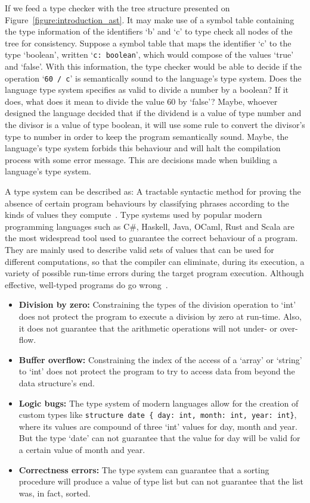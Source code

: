 \documentclass[english, lmodern, oneside, embeddedlogo]{ufsc-thesis-rn46-2019}
\begin{document}
If we feed a type checker with the tree structure presented on Figure~\ref{figure:introduction_ast}.
It may make use of a symbol table containing the type information of the identifiers `b' and `c' to type check all nodes of the tree for consistency.
Suppose a symbol table that maps the identifier `c' to the type `boolean', written `\verb+c: boolean+', which would compose of the values `true' and `false'.
With this information, the type checker would be able to decide if the operation `\verb+60 / c+' is semantically sound to the language's type system.
Does the language type system specifies as valid to divide a number by a boolean?
If it does, what does it mean to divide the value 60 by `false'?
Maybe, whoever designed the language decided that if the dividend is a value of type number and the divisor is a value of type boolean, it will use some rule to convert the divisor's type to number in order to keep the program semantically sound.
Maybe, the language's type system forbids this behaviour and will halt the compilation process with some error message.
This are decisions made when building a language's type system.

A type system can be described as: A tractable syntactic method for proving the absence of certain program behaviours by classifying phrases according to the kinds of values they compute~\cite{pierce2002types}.
Type systems used by popular modern programming languages such as C\#, Haskell, Java, OCaml, Rust and Scala are the most widespread tool used to guarantee the correct behaviour of a program.
They are mainly used to describe valid sets of values that can be used for different computations, so that the compiler can eliminate, during its execution, a variety of possible run-time errors during the target program execution.
Although effective, well-typed programs do go wrong~\cite{jhala2020refinement}.

\begin{itemize}
    \item \textbf{Division by zero:} Constraining the types of the division operation to `int' does not protect the program to execute a division by zero at run-time.
          Also, it does not guarantee that the arithmetic operations will not under- or over-flow.
    \item \textbf{Buffer overflow:} Constraining the index of the access of a `array' or `string' to `int' does not protect the program to try to access data from beyond the data structure's end.
    \item \textbf{Logic bugs:} The type system of modern languages allow for the creation of custom types like \verb+structure date { day: int, month: int, year: int}+, where its values are compound of three `int' values for day, month and year.
          But the type `date' can not guarantee that the value for day will be valid for a certain value of month and year.
    \item \textbf{Correctness errors:} The type system can guarantee that a sorting procedure will produce a value of type list  but can not guarantee that the list was, in fact, sorted.
\end{itemize}
\end{document}
